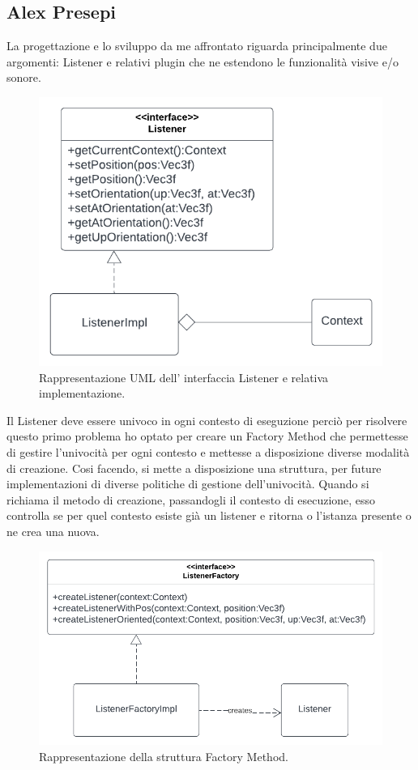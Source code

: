 \documentclass[a4paper,12pt]{report}
\begin{document}
\subsection*{Alex Presepi}
La progettazione e lo sviluppo da me affrontato riguarda principalmente due argomenti: Listener e relativi plugin che ne estendono le funzionalità visive e/o sonore.
\begin{figure}[H]
\centering{}
\includegraphics[width=\textwidth]{img/listener/Listener.png}
\caption{Rappresentazione UML dell' interfaccia Listener e relativa implementazione.}
\label{img:Listener}
\end{figure}
%
Il Listener deve essere univoco in ogni contesto di eseguzione perciò per risolvere questo primo problema ho optato per creare un Factory Method che permettesse di gestire l'univocità per ogni contesto e mettesse a disposizione diverse modalità di creazione. Cosi facendo, si mette a disposizione una struttura, per future implementazioni di diverse politiche di gestione dell'univocità. Quando si richiama il metodo di creazione, 
passandogli il contesto di esecuzione, esso controlla se per quel contesto esiste già un listener e ritorna o l'istanza presente o ne crea una nuova. 
\begin{figure}[H]
\centering{}
\includegraphics[width=\textwidth]{img/listener/ListenerFactory.png}
\caption{Rappresentazione della struttura Factory Method.}
\label{img:Listener}
\end{figure}
\end{document}
